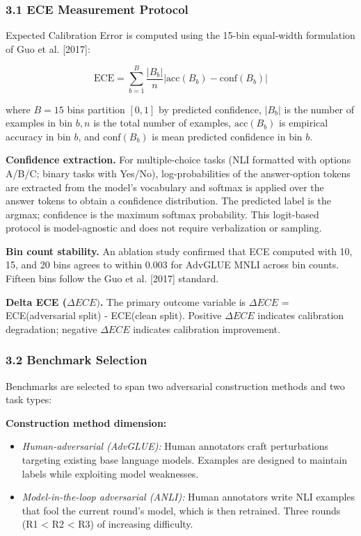 
\subsubsection{3.1 ECE Measurement Protocol}

Expected Calibration Error is computed using the 15-bin equal-width formulation of Guo et al. [2017]:

$$\text{ECE} = \sum_{b=1}^{B} \frac{|B_b|}{n} \left| \text{acc}(B_b) - \text{conf}(B_b) \right|$$

where $B = 15$ bins partition $[0, 1]$ by predicted confidence, $|B_b|$ is the number of examples in bin $b, n$ is the total number of examples, $\text{acc}(B_b)$ is empirical accuracy in bin $b$, and $\text{conf}(B_b)$ is mean predicted confidence in bin $b$.

\textbf{Confidence extraction.} For multiple-choice tasks (NLI formatted with options A/B/C; binary tasks with Yes/No), log-probabilities of the answer-option tokens are extracted from the model's vocabulary and softmax is applied over the answer tokens to obtain a confidence distribution. The predicted label is the argmax; confidence is the maximum softmax probability. This logit-based protocol is model-agnostic and does not require verbalization or sampling.

\textbf{Bin count stability.} An ablation study confirmed that ECE computed with 10, 15, and 20 bins agrees to within 0.003 for AdvGLUE MNLI across bin counts. Fifteen bins follow the Guo et al. [2017] standard.

\textbf{Delta ECE ($\Delta ECE)$.} The primary outcome variable is $\Delta ECE$ = ECE(adversarial split) - ECE(clean split). Positive $\Delta ECE$ indicates calibration degradation; negative $\Delta ECE$ indicates calibration improvement.

\subsubsection{3.2 Benchmark Selection}

Benchmarks are selected to span two adversarial construction methods and two task types:

\textbf{Construction method dimension:}
\begin{itemize}
\item \textit{Human-adversarial (AdvGLUE):} Human annotators craft perturbations targeting existing base language models. Examples are designed to maintain labels while exploiting model weaknesses.
\item \textit{Model-in-the-loop adversarial (ANLI):} Human annotators write NLI examples that fool the current round's model, which is then retrained. Three rounds (R1 < R2 < R3) of increasing difficulty.
\end{itemize}

